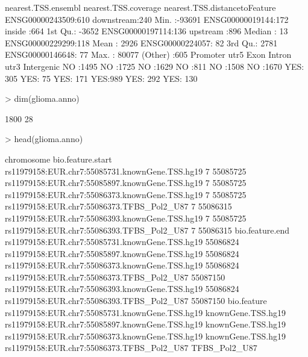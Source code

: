 \documentclass[a4paper]{article}
\begin{document}
\begin{Schunk}
\begin{Soutput}
      nearest.TSS.ensembl nearest.TSS.coverage nearest.TSS.distancetoFeature
 ENSG00000243509:610      downstream:240       Min.   :-93691               
 ENSG00000019144:172      inside    :664       1st Qu.: -3652               
 ENSG00000197114:136      upstream  :896       Median :    13               
 ENSG00000229299:118                           Mean   :  2926               
 ENSG00000224057: 82                           3rd Qu.:  2781               
 ENSG00000146648: 77                           Max.   : 80077               
 (Other)        :605                                                        
 Promoter    utr5       Exon      Intron     utr3      Intergenic
 NO :1495   NO :1725   NO :1629   NO :811   NO :1508   NO :1670  
 YES: 305   YES:  75   YES: 171   YES:989   YES: 292   YES: 130  
\end{Soutput}
\begin{Sinput}
> dim(glioma.anno)
\end{Sinput}
\begin{Soutput}
[1] 1800   28
\end{Soutput}
\begin{Sinput}
> head(glioma.anno)
\end{Sinput}
\begin{Soutput}
                                                chromosome bio.feature.start
rs11979158:EUR.chr7:55085731.knownGene.TSS.hg19          7          55085725
rs11979158:EUR.chr7:55085897.knownGene.TSS.hg19          7          55085725
rs11979158:EUR.chr7:55086373.knownGene.TSS.hg19          7          55085725
rs11979158:EUR.chr7:55086373.TFBS_Pol2_U87               7          55086315
rs11979158:EUR.chr7:55086393.knownGene.TSS.hg19          7          55085725
rs11979158:EUR.chr7:55086393.TFBS_Pol2_U87               7          55086315
                                                bio.feature.end
rs11979158:EUR.chr7:55085731.knownGene.TSS.hg19        55086824
rs11979158:EUR.chr7:55085897.knownGene.TSS.hg19        55086824
rs11979158:EUR.chr7:55086373.knownGene.TSS.hg19        55086824
rs11979158:EUR.chr7:55086373.TFBS_Pol2_U87             55087150
rs11979158:EUR.chr7:55086393.knownGene.TSS.hg19        55086824
rs11979158:EUR.chr7:55086393.TFBS_Pol2_U87             55087150
                                                       bio.feature
rs11979158:EUR.chr7:55085731.knownGene.TSS.hg19 knownGene.TSS.hg19
rs11979158:EUR.chr7:55085897.knownGene.TSS.hg19 knownGene.TSS.hg19
rs11979158:EUR.chr7:55086373.knownGene.TSS.hg19 knownGene.TSS.hg19
rs11979158:EUR.chr7:55086373.TFBS_Pol2_U87           TFBS_Pol2_U87

\end{Soutput}
\end{Schunk}
\end{document}
